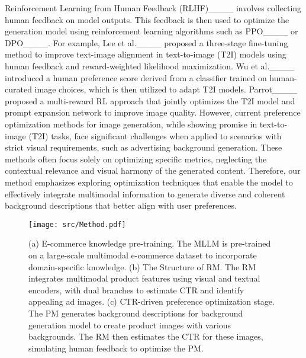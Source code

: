 Reinforcement Learning from Human Feedback (RLHF)____ involves collecting human feedback on model outputs. This feedback is then used to optimize the generation model using reinforcement learning algorithms such as PPO____ or DPO____.
%
For example, Lee et al.____ proposed a three-stage fine-tuning method to improve text-image alignment in text-to-image (T2I) models using human feedback and reward-weighted likelihood maximization.
Wu et al.____ introduced a human preference score derived from a classifier trained on human-curated image choices, which is then utilized to adapt T2I models. Parrot____ proposed a multi-reward RL approach that jointly optimizes the T2I model and prompt expansion network to improve image quality.
%
However, current preference optimization methods for image generation, while showing promise in text-to-image (T2I) tasks, face significant challenges when applied to scenarios with strict visual requirements, such as advertising background generation. These methods often focus solely on optimizing specific metrics, neglecting the contextual relevance and visual harmony of the generated content. 
%
Therefore, our method emphasizes exploring optimization techniques that enable the model to effectively integrate multimodal information to generate diverse and coherent background descriptions that better align with user preferences.

\begin{figure*}[t!]
    \centering
    \texttt{[image: src/Method.pdf]}
    \vspace{-1em}
    \caption{(a) E-commerce knowledge pre-training. The MLLM is pre-trained on a large-scale multimodal e-commerce dataset to incorporate domain-specific knowledge. (b) The Structure of RM. The RM integrates multimodal product features using visual and textual encoders, with dual branches to estimate CTR and identify appealing ad images. (c)  CTR-driven preference optimization stage. The PM generates background descriptions for background generation model to create product images with various backgrounds. The RM then estimates the CTR for these images, simulating human feedback to optimize the PM.}
    \label{fig:1}
\end{figure*}